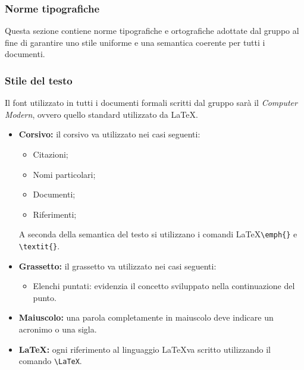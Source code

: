 \documentclass[a4paper]{article}
\begin{document}
		\subsubsection{Norme tipografiche}
			Questa sezione contiene norme tipografiche e ortografiche adottate dal gruppo al fine di garantire uno stile
			uniforme e una semantica coerente per tutti i documenti.
		\subsubsection{Stile del testo}
			Il font utilizzato in tutti i documenti formali scritti dal gruppo sarà il \emph{Computer Modern}, ovvero
			quello standard utilizzato da \LaTeX.
		\begin{itemize}
			\item \textbf{Corsivo:} il corsivo va utilizzato nei casi seguenti:
			\begin{itemize}
				\item Citazioni;
				\item Nomi particolari;
				\item Documenti;
				\item Riferimenti;
			\end{itemize}
			A seconda della semantica del testo si utilizzano i comandi \LaTeX \space \verb|\emph{}| e \verb|\textit{}|.
			\item \textbf{Grassetto:} il grassetto va utilizzato nei casi seguenti:
			\begin{itemize}
				\item Elenchi puntati: evidenzia il concetto sviluppato nella continuazione del punto.
			\end{itemize}
			\item \textbf{Maiuscolo:} una parola completamente in maiuscolo deve indicare un acronimo o una sigla.
			\item \textbf{\LaTeX:} ogni riferimento al linguaggio \LaTeX \space va scritto utilizzando il comando
			\verb|\LaTeX|.
		\end{itemize}
\end{document}
